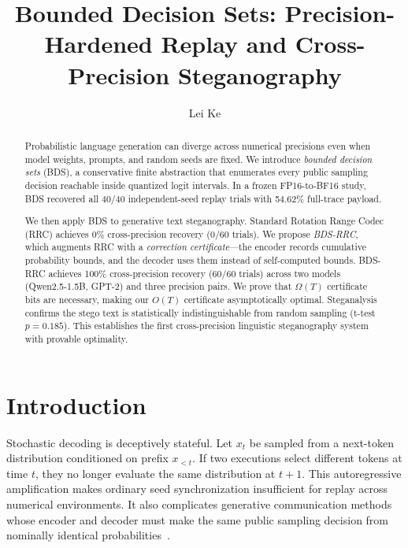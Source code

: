 \documentclass[sigconf,review,nonacm]{acmart}
\title{Bounded Decision Sets: Precision-Hardened Replay and Cross-Precision Steganography}
\author{Lei Ke}
\begin{document}
\begin{abstract}
Probabilistic language generation can diverge across numerical precisions even when model weights, prompts, and random seeds are fixed. We introduce \emph{bounded decision sets} (BDS), a conservative finite abstraction that enumerates every public sampling decision reachable inside quantized logit intervals. In a frozen FP16-to-BF16 study, BDS recovered all 40/40 independent-seed replay trials with 54.62\% full-trace payload.

We then apply BDS to generative text steganography. Standard Rotation Range Codec (RRC) achieves 0\% cross-precision recovery (0/60 trials). We propose \emph{BDS-RRC}, which augments RRC with a \emph{correction certificate}---the encoder records cumulative probability bounds, and the decoder uses them instead of self-computed bounds. BDS-RRC achieves 100\% cross-precision recovery (60/60 trials) across two models (Qwen2.5-1.5B, GPT-2) and three precision pairs. We prove that $\Omega(T)$ certificate bits are necessary, making our $O(T)$ certificate asymptotically optimal. Steganalysis confirms the stego text is statistically indistinguishable from random sampling (t-test $p=0.185$). This establishes the first cross-precision linguistic steganography system with provable optimality.
\end{abstract}


\maketitle

\section{Introduction}
Stochastic decoding is deceptively stateful. Let $x_t$ be sampled from a next-token distribution conditioned on prefix $x_{<t}$. If two executions select different tokens at time $t$, they no longer evaluate the same distribution at $t+1$. This autoregressive amplification makes ordinary seed synchronization insufficient for replay across numerical environments. It also complicates generative communication methods whose encoder and decoder must make the same public sampling decision from nominally identical probabilities~\cite{wang2025sparsamp,yan2026range}.
\end{document}
